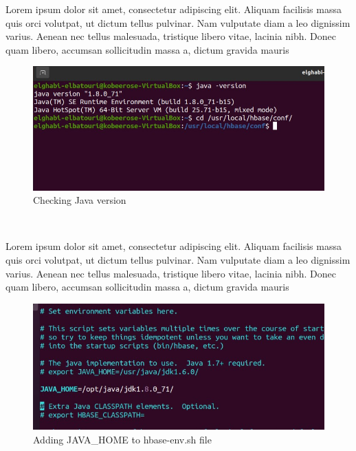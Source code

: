 \begin{spacing}{1.2}
\par Lorem ipsum dolor sit amet, consectetur adipiscing elit. Aliquam facilisis massa quis orci volutpat, ut dictum tellus pulvinar. Nam vulputate diam a leo dignissim varius. Aenean nec tellus malesuada, tristique libero vitae, lacinia nibh. Donec quam libero, accumsan sollicitudin massa a, dictum gravida mauris
\\
\begin{figure}[!htb] 
\begin{center} 
\includegraphics[width=1\linewidth]{Pictures/HBase/Configuring Hbase in Standalone & Pseudo-distributed mode/Installing and Configuring Apache Hbase/Checking Java version} 
\end{center} 
\caption{Checking Java version} 
\end{figure}  \FloatBarrier
\\

\par Lorem ipsum dolor sit amet, consectetur adipiscing elit. Aliquam facilisis massa quis orci volutpat, ut dictum tellus pulvinar. Nam vulputate diam a leo dignissim varius. Aenean nec tellus malesuada, tristique libero vitae, lacinia nibh. Donec quam libero, accumsan sollicitudin massa a, dictum gravida mauris
\\
\begin{figure}[!htb] 
\begin{center} 
\includegraphics[width=1\linewidth]{Pictures/HBase/Configuring Hbase in Standalone & Pseudo-distributed mode/Installing and Configuring Apache Hbase/Adding JAVA_HOME to hbase-env.sh file} 
\end{center} 
\caption{Adding JAVA_HOME to hbase-env.sh file} 
\end{figure}  \FloatBarrier
\\


\end{spacing}

